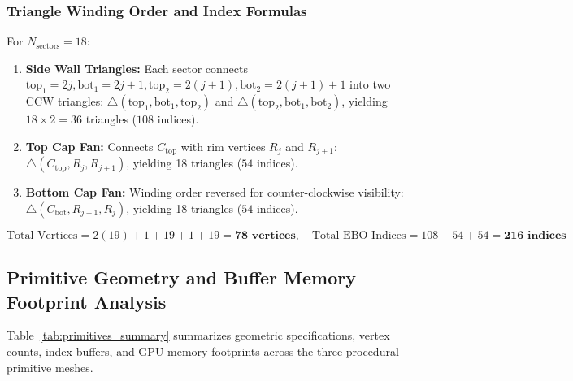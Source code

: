 \documentclass[11pt,a4paper]{article}
\begin{document}
\subsubsection{Triangle Winding Order and Index Formulas}
For $N_{\text{sectors}} = 18$:
\begin{enumerate}[leftmargin=1.2em, itemsep=0.5pt, topsep=0.5pt]
    \item \textbf{Side Wall Triangles:} Each sector connects $\text{top}_1 = 2j, \text{bot}_1 = 2j+1, \text{top}_2 = 2(j+1), \text{bot}_2 = 2(j+1)+1$ into two CCW triangles: $\triangle(\text{top}_1, \text{bot}_1, \text{top}_2)$ and $\triangle(\text{top}_2, \text{bot}_1, \text{bot}_2)$, yielding $18 \times 2 = 36$ triangles ($108$ indices).
    \item \textbf{Top Cap Fan:} Connects $C_{\text{top}}$ with rim vertices $R_j$ and $R_{j+1}$: $\triangle(C_{\text{top}}, R_j, R_{j+1})$, yielding 18 triangles ($54$ indices).
    \item \textbf{Bottom Cap Fan:} Winding order reversed for counter-clockwise visibility: $\triangle(C_{\text{bot}}, R_{j+1}, R_j)$, yielding 18 triangles ($54$ indices).
\end{enumerate}
\begin{equation}
    \text{Total Vertices} = 2(19) + 1 + 19 + 1 + 19 = \mathbf{78 \text{ vertices}}, \quad \text{Total EBO Indices} = 108 + 54 + 54 = \mathbf{216 \text{ indices}}
\end{equation}




\subsection{Primitive Geometry and Buffer Memory Footprint Analysis}
Table~\ref{tab:primitives_summary} summarizes geometric specifications, vertex counts, index buffers, and GPU memory footprints across the three procedural primitive meshes.
\end{document}
